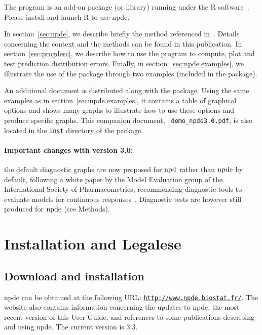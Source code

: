 \documentclass[12pt,a4paper]{article}
\def\npde{{\rm npde}}
\def\npd{{\rm npd}}
\begin{document}
The program is an add-on package (or library) running under the {\sf R} software~\cite{R}. Please install and launch {\sf R} to use {\sf npde}.

\bigskip

In section~\ref{sec:npde}, we describe briefly the method referenced in~\cite{Brendel06}. Details concerning the context and the methods can be found in this publication. In section~\ref{sec:progdesc}, we describe how to use the program to compute, plot and test prediction distribution errors. Finally, in section~\ref{sec:npde.examples}, we illustrate the use of the package through two examples (included in the package).

An additional document is distributed along with the package. Using the same examples as in section~\ref{sec:npde.examples}, it contains a table of graphical options and shows many graphs to illustrate how to use these options and produce specific graphs. This companion document, \verb+ demo_npde3.0.pdf+, is also located in the \texttt{inst} directory of the package.

\paragraph{Important changes with version 3.0:} the default diagnostic graphs are now proposed for $\npd$ rather than $\npde$ by default, following a white paper by the Model Evaluation group of the International Society of Pharmacometrics, recommending diagnostic tools to evaluate models for continuous responses~\cite{Nguyen17}. Diagnostic tests are however still produced for $\npde$ (see Methods).

\clearpage

\section{Installation and Legalese}

\subsection{Download and installation}

\hskip 18pt {\sf npde} can be obtained at the following URL: 
\href{http://www.npde.biostat.fr/}{\texttt{http://www.npde.biostat.fr/}}. The website also contains information
concerning the updates to {\sf npde}, the most recent version of this User Guide, and references to some publications 
describing and using {\sf npde}. The current version is 3.3. 
\end{document}

